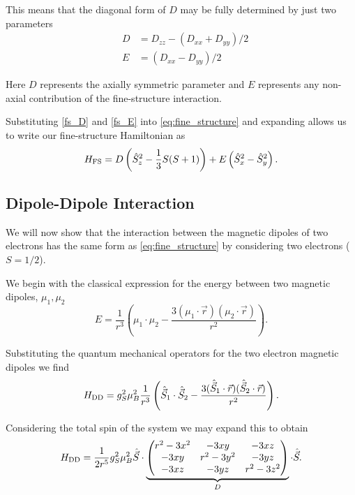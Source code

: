 This means that the diagonal form of $D$ may be fully determined by just two parameters 
\begin{eqnarray}
    &D &= D_{zz} - (D_{xx}+ D_{yy})/2 \label{fs_D}\\ 
    &E &= (D_{xx} - D_{yy})/2 \label{fs_E}
\end{eqnarray}

Here $D$ represents the axially symmetric parameter and $E$ represents any non-axial contribution of the fine-structure interaction. 

Substituting \eqref{fs_D} and \eqref{fs_E} into \eqref{eq:fine_structure} and expanding allows us to write our fine-structure Hamiltonian as
\begin{equation}
    H_{\ce{FS}} = D \left(\hat{S}_z^2 - \frac{1}{3}S(S+1)\right) + E\left(\hat{S}_x^2 - \hat{S}_y^2\right).
    \label{eq:fine_structure_hamiltonian}
\end{equation}

\subsection{Dipole-Dipole Interaction}
We will now show that the interaction between the magnetic dipoles of two electrons has the same form as \eqref{eq:fine_structure} by considering two electrons ($S=1/2$). 

We begin with the classical expression for the energy between two magnetic dipoles, $\mu_1, \mu_2$
\begin{equation}
    E = \frac{1}{r^3} \left(\mu_1 \cdot \mu_2 -\frac{3(\mu_1 \cdot \vec{r})(\mu_2 \cdot \vec{r})}{r^2}\right).
\end{equation}

Substituting the quantum mechanical operators for the two electron magnetic dipoles we find 
\begin{equation}
    H_{\ce{DD}} = g_S^2 \mu_B^2 \frac{1}{r^3} \left(\hat{\vec{S}}_1 \cdot \hat{\vec{S}}_2 -\frac{3(\hat{\vec{S}}_1 \cdot \vec{r})(\hat{\vec{S}}_2 \cdot \vec{r})}{r^2}\right).
\end{equation}

Considering the total spin of the system we may expand this to obtain \cite{carrington1967introduction} 
\begin{equation}
    H_{\ce{DD}} = \frac{1}{2r^5}g_S^2 \mu_B^2 \hat{\vec{S}} \cdot
    \underbrace{
    \begin{pmatrix}
        {r^2 - 3x^2} & -3xy & - 3xz\\ 
        -3xy & r^2 - 3y^2 & -3yz \\ 
        -3xz & -3yz & r^2 - 3z^2 
    \end{pmatrix}
}_{D}
    \cdot \hat{\vec{S}}.
    \label{eq:dd_matrix_form}
\end{equation}

